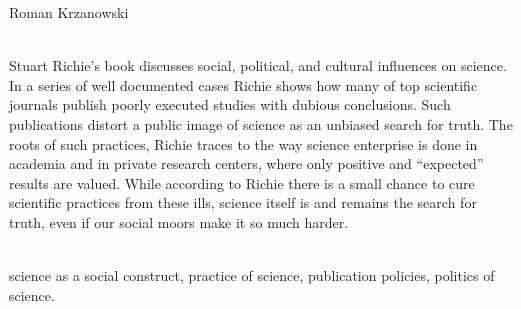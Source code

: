 \begin{newrevengenv}{Roman Krzanowski}



\vspace{15mm}%
{}\\
{Stuart Richie's book discusses social, political, and cultural influences on science. In a series of well documented cases Richie shows how many of top scientific journals publish poorly executed studies with dubious conclusions. Such publications distort a public image of science as an unbiased search for truth. The roots of such practices, Richie traces to the way science enterprise is done in academia and in private research centers, where only positive and ``expected'' results are valued. While according to Richie there is a small chance to cure scientific practices from these ills, science itself is and remains the search for truth, even if our social moors make it so much harder.}\par%
\vspace{2mm}%
{}\\
{science as a social construct, practice of science, publication policies, politics of science.}%



\end{newrevengenv}
